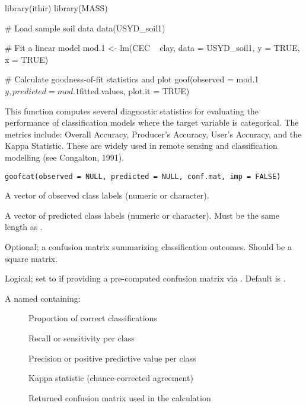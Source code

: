 \documentclass[a4paper]{book}
\begin{document}
%
\begin{Examples}
\begin{ExampleCode}
library(ithir)
library(MASS)

# Load sample soil data
data(USYD_soil1)

# Fit a linear model
mod.1 <- lm(CEC ~ clay, data = USYD_soil1, y = TRUE, x = TRUE)

# Calculate goodness-of-fit statistics and plot
goof(observed = mod.1$y, predicted = mod.1$fitted.values, plot.it = TRUE)
\end{ExampleCode}
\end{Examples}
%
\begin{Description}
This function computes several diagnostic statistics for evaluating the performance of classification models where the target variable is categorical. The metrics include: Overall Accuracy, Producer’s Accuracy, User’s Accuracy, and the Kappa Statistic. These are widely used in remote sensing and classification modelling (see Congalton, 1991).
\end{Description}
%
\begin{Usage}
\begin{verbatim}
goofcat(observed = NULL, predicted = NULL, conf.mat, imp = FALSE)
\end{verbatim}
\end{Usage}
%
\begin{Arguments}
\begin{ldescription}
\item[\code{observed}] A vector of observed class labels (numeric or character).
\item[\code{predicted}] A vector of predicted class labels (numeric or character). Must be the same length as .
\item[\code{conf.mat}] Optional; a confusion matrix summarizing classification outcomes. Should be a square matrix.
\item[\code{imp}] Logical; set to  if providing a pre-computed confusion matrix via . Default is .
\end{ldescription}
\end{Arguments}
%
\begin{Value}
A named  containing:
\begin{description}

\item[] Proportion of correct classifications
\item[] Recall or sensitivity per class
\item[] Precision or positive predictive value per class
\item[] Kappa statistic (chance-corrected agreement)
\item[] Returned confusion matrix used in the calculation

\end{description}

\end{Value}
\end{document}
